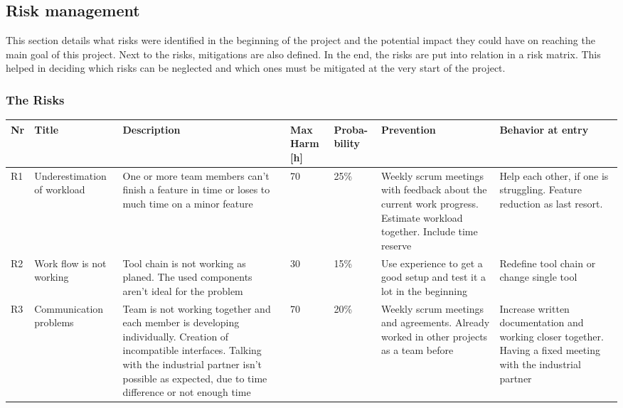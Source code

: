 \subsection{Risk management}
This section details what risks were identified in the beginning of the project and the potential impact they could have on reaching the main goal of this project. Next to the risks, mitigations are also defined. In the end, the risks are put into relation in a risk matrix. This helped in deciding which risks can be neglected and which ones must be mitigated at the very start of the project. 
\subsubsection{The Risks}
\begin{landscape}
	\begin{longtable}[H]
		{l|p{}| p{} | p{} | p{} | p{} | p{}}
		\rowcolor{gray!50}
		\textbf{Nr} & \textbf{Title} & \textbf{Description} & 
		\textbf{Max Harm [h]} & \textbf{Proba- bility} & \textbf{Prevention} &  
		\textbf{Behavior at entry}\\ \hline
		
		R1 & Underestimation of workload & One or more team members can't finish a feature in time or loses to much time on a minor feature & 70 & 25\% & Weekly scrum meetings with feedback about the current work progress. Estimate workload together. Include time reserve & Help each other, if one is struggling. Feature reduction as last resort. \\ 
		
		R2 & Work flow is not working & Tool chain is not working as planed. The used components aren't ideal for the problem & 30 & 15\% & Use experience to get a good setup and test it a lot in the beginning & Redefine tool chain or change single tool \\ 
		
		R3 & Communication problems & Team is not working together and each member is developing individually. Creation of incompatible interfaces. Talking with the industrial partner isn't possible as expected, due to time difference or not enough time & 70 & 20\% & Weekly scrum meetings and agreements. Already worked in other projects as a team before & Increase written documentation and working closer together. Having a fixed meeting with the industrial partner \\ 
		

\end{longtable}
\end{landscape}
